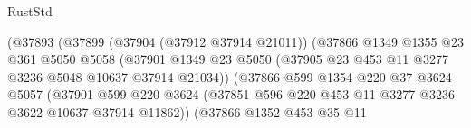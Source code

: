 \begin{lexlean}{RustStd}
\begin{coremodule}
                                    (@37893
                                      (@37899
                                        (@37904 (@37912 @37914 @21011))
                                        (@37866
                                          @1349
                                          @1355
                                          @23
                                          @361
                                          @5050
                                          @5058
                                          (@37901
                                            @1349
                                            @23
                                            @5050
                                            (@37905
                                              @23
                                              @453
                                              @11
                                              @3277
                                              @3236
                                              @5048
                                              @10637
                                              @37914
                                              @21034))
                                          (@37866
                                            @599
                                            @1354
                                            @220
                                            @37
                                            @3624
                                            @5057
                                            (@37901
                                              @599
                                              @220
                                              @3624
                                              (@37851
                                                @596
                                                @220
                                                @453
                                                @11
                                                @3277
                                                @3236
                                                @3622
                                                @10637
                                                @37914
                                                @11862))
                                            (@37866
                                              @1352
                                              @453
                                              @35
                                              @11

\end{coremodule}
\end{lexlean}
